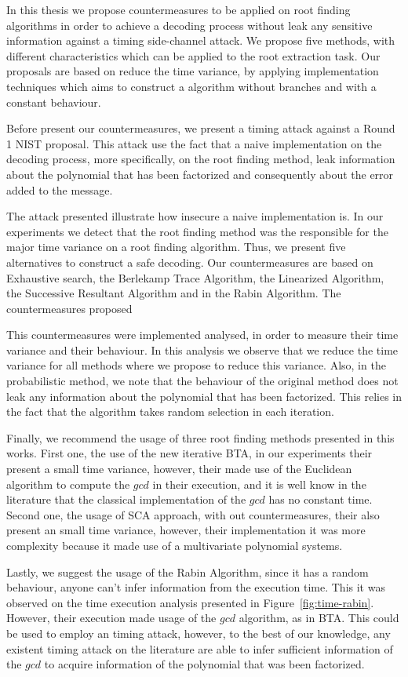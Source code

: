 In this thesis we propose countermeasures to be applied on root finding algorithms in order to achieve a decoding process without leak any sensitive information against a timing side-channel attack. We propose five methods, with different characteristics which can be applied to the root extraction task. Our proposals are based on reduce the time variance, by applying implementation techniques which aims to construct a algorithm without branches and with a constant behaviour. 

Before present our countermeasures, we present a timing attack against a Round 1 NIST proposal. This attack use the fact that a naive implementation on the decoding process, more specifically, on the root finding method, leak information about the polynomial that has been factorized and consequently about the error added to the message. 

The attack presented illustrate how insecure a naive implementation is. In our experiments we detect that the root finding method was the responsible for the major time variance on a root finding algorithm. Thus, we present five alternatives to construct a safe decoding. Our countermeasures are based on Exhaustive search, the Berlekamp Trace Algorithm, the Linearized Algorithm, the Successive Resultant Algorithm and in the Rabin Algorithm. The countermeasures proposed 

This countermeasures were implemented analysed, in order to measure their time variance and their behaviour. In this analysis we observe that we reduce the time variance for all methods where we propose to reduce this variance. Also, in the probabilistic method, we note that the behaviour of the original method does not leak any information about the polynomial that has been factorized. This relies in the fact that the algorithm takes random selection in each iteration.

Finally, we recommend the usage of three root finding methods presented in this works. First one, the use of the new iterative BTA, in our experiments their present a small time variance, however, their made use of the Euclidean algorithm to compute the $gcd$ in their execution, and it is well know in the literature that the classical implementation of the $gcd$ has no constant time. Second one, the usage of SCA approach, with out countermeasures, their also present an small time variance, however, their implementation it was more complexity because it made use of a multivariate polynomial systems.

Lastly, we suggest the usage of the Rabin Algorithm, since it has a random behaviour, anyone can't infer information from the execution time. This it was observed on the time execution analysis presented in Figure~\ref{fig:time-rabin}. However, their execution made usage of the $gcd$ algorithm, as in BTA. This could be used to employ an timing attack, however, to the best of our knowledge, any existent timing attack on the literature are able to infer sufficient information of the $gcd$ to acquire information of the polynomial that was been factorized.

